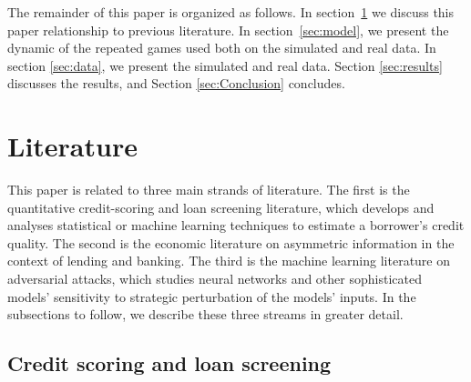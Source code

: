 \documentclass[12pt]{article} %
\begin{document}
The remainder of this paper is organized as follows. In section~\ref{sec:literature} we discuss this paper relationship to previous literature. In section~\ref{sec:model}, we present the dynamic of the repeated games used both on the simulated and real data. In section \ref{sec:data}, we present the simulated and real data. Section \ref{sec:results} discusses the results,
and Section \ref{sec:Conclusion} concludes. 


\section{Literature}
\label{sec:literature}

This paper is related to three main strands of literature. The first is the quantitative credit-scoring and loan screening literature, which develops and analyses statistical or machine learning techniques to estimate a borrower's credit quality. The second is the economic literature on asymmetric information in the context of lending and banking. The third is the machine learning literature on adversarial attacks, which studies neural networks and other sophisticated models' sensitivity to strategic perturbation of the models' inputs.  
In the subsections to follow, we describe these three streams in greater detail.

%
\subsection{Credit scoring and loan screening}
\end{document}

